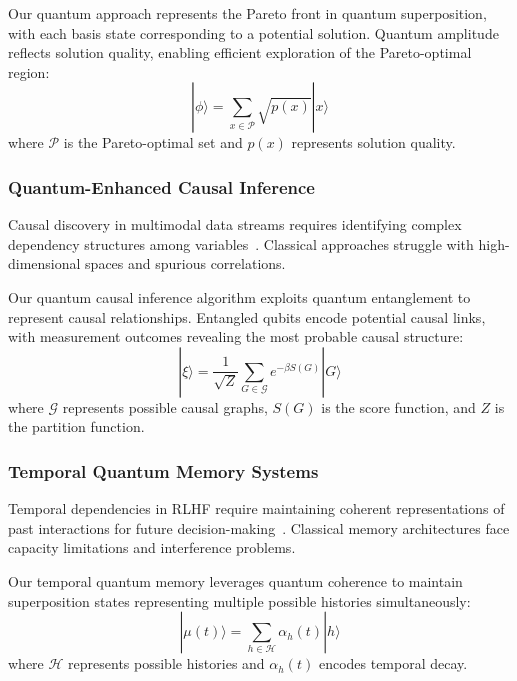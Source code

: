 \documentclass[fleqn,10pt]{wlscirep}
\begin{document}
Our quantum approach represents the Pareto front in quantum superposition, with each basis state corresponding to a potential solution. Quantum amplitude reflects solution quality, enabling efficient exploration of the Pareto-optimal region:
\begin{equation}
|\phi\rangle = \sum_{x \in \mathcal{P}} \sqrt{p(x)} |x\rangle
\end{equation}
where $\mathcal{P}$ is the Pareto-optimal set and $p(x)$ represents solution quality.

\subsubsection{Quantum-Enhanced Causal Inference}

Causal discovery in multimodal data streams requires identifying complex dependency structures among variables~\cite{peters2017elements,spirtes2000causation}. Classical approaches struggle with high-dimensional spaces and spurious correlations.

Our quantum causal inference algorithm exploits quantum entanglement to represent causal relationships. Entangled qubits encode potential causal links, with measurement outcomes revealing the most probable causal structure:
\begin{equation}
|\xi\rangle = \frac{1}{\sqrt{Z}} \sum_{G \in \mathcal{G}} e^{-\beta S(G)} |G\rangle
\end{equation}
where $\mathcal{G}$ represents possible causal graphs, $S(G)$ is the score function, and $Z$ is the partition function.

\subsubsection{Temporal Quantum Memory Systems}

Temporal dependencies in RLHF require maintaining coherent representations of past interactions for future decision-making~\cite{graves2016hybrid,santoro2016meta}. Classical memory architectures face capacity limitations and interference problems.

Our temporal quantum memory leverages quantum coherence to maintain superposition states representing multiple possible histories simultaneously:
\begin{equation}
|\mu(t)\rangle = \sum_{h \in \mathcal{H}} \alpha_h(t) |h\rangle
\end{equation}
where $\mathcal{H}$ represents possible histories and $\alpha_h(t)$ encodes temporal decay.
\end{document}
